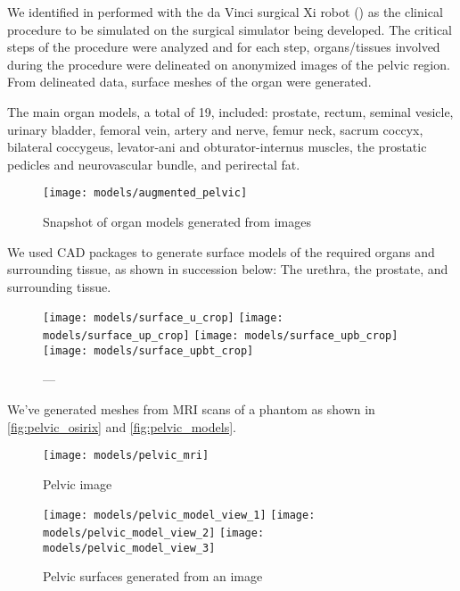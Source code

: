 We identified  in  performed with the da Vinci surgical Xi robot () as the clinical procedure to be simulated on the surgical simulator being developed. The critical steps of the  procedure were analyzed and for each step, organs/tissues involved during the procedure were delineated on anonymized  images of the pelvic region. From delineated data,  surface meshes of the organ were generated.

The main organ models, a total of 19, included: prostate, rectum, seminal vesicle, urinary bladder, femoral vein, artery and nerve, femur neck, sacrum coccyx, bilateral coccygeus, levator-ani and obturator-internus muscles, the prostatic pedicles and neurovascular bundle, and perirectal fat.

\begin{figure}
  \centering%
  \texttt{[image: models/augmented\_pelvic]}
  \caption{Snapshot of organ models generated from  images}
  \label{fig:organ_generation}
\end{figure}

We used CAD packages to generate surface models of the required organs and surrounding tissue, as shown in succession below: The urethra, the prostate, and surrounding tissue.

\begin{figure}
  \centering%
  \texttt{[image: models/surface\_u\_crop]}\hfill%
  \texttt{[image: models/surface\_up\_crop]}\hfill%
  \texttt{[image: models/surface\_upb\_crop]}\hfill%
  \texttt{[image: models/surface\_upbt\_crop]}
  \caption{---}
  \label{fig:surface_meshes}
\end{figure}

We've generated meshes from MRI scans of a phantom as shown in \autoref{fig:pelvic_osirix} and \autoref{fig:pelvic_models}.

\begin{figure}
  \centering%
	\texttt{[image: models/pelvic\_mri]}\\[10ex]
	\caption{Pelvic  image}
	\label{fig:pelvic_osirix}
\end{figure}
\begin{figure}
  \centering%
	\texttt{[image: models/pelvic\_model\_view\_1]}\hfill%
	\texttt{[image: models/pelvic\_model\_view\_2]}\hfill%
	\texttt{[image: models/pelvic\_model\_view\_3]}
	\caption{Pelvic surfaces generated from an  image}
	\label{fig:pelvic_models}
\end{figure}

